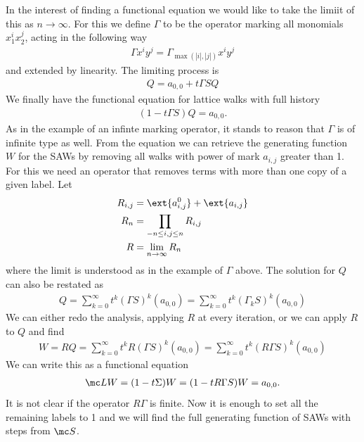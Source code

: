 In the interest of finding a functional equation we would like to take the limiit of this as $n \to \infty$. For this we define $\Gamma$ to be the operator marking all monomials $x_1^ix_2^j$, acting in the following way
\begin{align}
	\Gamma x^i y^j = \Gamma_{\max(|i|,|j|)} x^i y^j
\end{align}
and extended by linearity. The limiting process is
\begin{align}
	Q = a_{0,0} + t \Gamma SQ
\end{align}
We finally have the functional equation for lattice walks with full history
\begin{align}
	(1 -t\Gamma S)Q = a_{0,0}.
\end{align}
As in the example of an infinte marking operator, it stands to reason that $\Gamma$ is of infinite type as well. From the equation we can retrieve the generating function $W$ for the SAWs by removing all walks with power of mark $a_{i,j}$ greater than 1. For this we need an operator that removes terms with more than one copy of a given label. Let
\begin{align}
	R_{i,j} &= \ext{a_{i,j}^0} + \ext{a_{i,j}}\\
	R_n &= \prod_{-n\leq i,j \leq n} R_{i,j}\\
	R &= \lim_{n\to \infty} R_n
\end{align}
where the limit is understood as in the example of $\Gamma$ above. The solution for $Q$ can also be restated as
\begin{align}
	Q = \sum_{k=0}^{\infty} t^k (\Gamma S)^{k}(a_{0,0}) = \sum_{k=0}^{\infty} t^k (\Gamma_k S)^{k}(a_{0,0}) 
\end{align}
We can either redo the analysis, applying $R$ at every iteration, or we can apply $R$ to $Q$ and find
\begin{align}
	W = RQ = \sum_{k=0}^{\infty} t^k R(\Gamma S)^{k}(a_{0,0}) = \sum_{k=0}^{\infty} t^k (R\Gamma S)^{k}(a_{0,0}) 
\end{align}
We can write this as a functional equation
\begin{align}
	\mc L W = (1-t\Sigma)W = (1-tR\Gamma S)W = a_{0,0}.
\end{align}
It is not clear if the operator $R\Gamma$ is finite. Now it is enough to set all the remaining labels to 1 and we will find the full generating function of SAWs with steps from $\mc S $.

